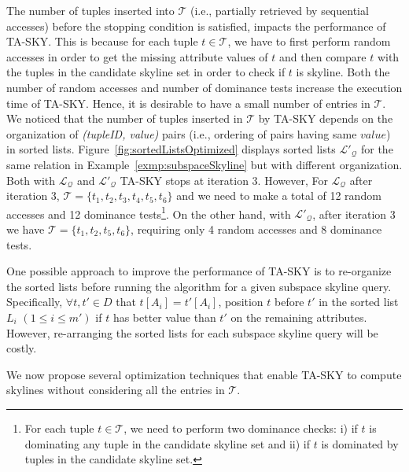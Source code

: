 The number of tuples inserted into $\mathcal{T}$ (i.e., partially retrieved by sequential accesses) before the stopping condition is satisfied, impacts the performance of TA-SKY. This is because for each tuple $t \in \mathcal{T}$, we have to first perform random accesses in order to get the missing attribute values of $t$ and then compare $t$ with the tuples in the candidate skyline set in order to check if $t$ is skyline. Both the number of random accesses and number of dominance tests increase the execution time of TA-SKY. Hence, it is desirable to have a small number of entries in $\mathcal{T}$.  We noticed that the number of tuples inserted in $\mathcal{T}$ by TA-SKY depends on the organization of \textit{(tupleID, value)} pairs (i.e., ordering of pairs having same $value$) in sorted lists. Figure~\ref{fig:sortedListsOptimized} displays sorted lists $\mathcal{L'_Q}$ for the same relation in Example~\ref{exmp:subspaceSkyline} but with different organization. Both with $\mathcal{L_Q}$ and $\mathcal{L'_Q}$ TA-SKY stops at iteration 3. However, For $\mathcal{L_Q}$ after iteration 3, $\mathcal{T} = \{t_1, t_2, t_3, t_4, t_5, t_6\}$ and we need to make a total of 12 random accesses and 12 dominance tests\footnote{For each tuple $t \in \mathcal{T}$, we need to perform two dominance checks: i) if $t$ is dominating any tuple in the candidate skyline set and ii) if $t$ is dominated by tuples in the candidate skyline set.}. On the other hand, with $\mathcal{L'_Q}$, after iteration 3 we have $\mathcal{T} = \{t_1, t_2, t_5, t_6\}$, requiring only 4 random accesses and 8 dominance tests.



One possible approach to improve the performance of TA-SKY is to re-organize the sorted lists before running the algorithm for a given subspace skyline query. Specifically, $\forall t, t' \in D$ that $t[A_i] = t'[A_i]$, position $t$ before $t'$ in the sorted list $L_i$ $(1 \leq i \leq m')$ if $t$ has better value than $t'$ on the remaining attributes. However, re-arranging the sorted lists for each subspace skyline query will be costly. %

We now propose several optimization techniques that enable TA-SKY to compute skylines without considering all the entries in $\mathcal{T}$.

